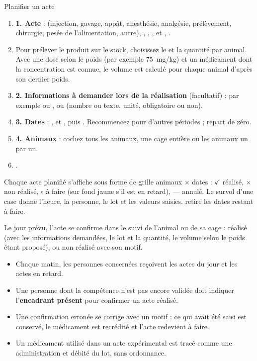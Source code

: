 \documentclass[11pt,a4paper]{article}
\begin{document}
\begin{procedure}{Planifier un acte}
\begin{enumerate}
  \item \textbf{1. Acte} :  (injection, gavage, appât,
    anesthésie, analgésie, prélèvement, chirurgie, pesée de l'alimentation,
    autre), , ,
    ,  et ,
    .
  \item Pour prélever le produit sur le stock, choisissez le
     et la quantité par animal. Avec une dose selon
    le poids (par exemple 75~mg/kg) et un médicament dont la concentration
    est connue, le volume est calculé pour chaque animal d'après son dernier
    poids.
  \item \textbf{2. Informations à demander lors de la réalisation}
    (facultatif) : par exemple  ou
    , ou  (nombre ou
    texte, unité, obligatoire ou non).
  \item \textbf{3. Dates} : ,  et ,
    puis . Recommencez pour d'autres périodes ;
     repart de zéro.
  \item \textbf{4. Animaux} : cochez tous les animaux, une cage entière ou
    les animaux un par un.
  \item {}.
\end{enumerate}
\end{procedure}

Chaque acte planifié s'affiche sous forme de grille animaux × dates :
$\checkmark$ réalisé, $\times$ non réalisé, $\circ$ à faire (sur fond jaune
s'il est en retard), --- annulé. Le survol d'une case donne l'heure, la
personne, le lot et les valeurs saisies.  retire les dates
restant à faire.

Le jour prévu, l'acte se confirme dans le suivi de l'animal ou de sa cage :
réalisé (avec les informations demandées, le lot et la quantité, le volume
selon le poids étant proposé), ou non réalisé avec son motif.
\begin{regle}
\begin{itemize}
  \item Chaque matin, les personnes concernées reçoivent les actes du jour et
    les actes en retard.
  \item Une personne dont la compétence n'est pas encore validée doit
    indiquer l'\textbf{encadrant présent} pour confirmer un acte réalisé.
  \item Une confirmation erronée se corrige avec un motif : ce qui avait été
    saisi est conservé, le médicament est recrédité et l'acte redevient à
    faire.
  \item Un médicament utilisé dans un acte expérimental est tracé comme une
    administration et débité du lot, sans ordonnance.
\end{itemize}
\end{regle}
\end{document}
